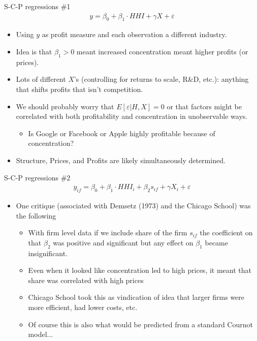\documentclass[xcolor=pdftex,dvipsnames,table,mathserif,aspectratio=169]{beamer}
\begin{document}
\begin{frame}{S-C-P regressions \#1}
\begin{eqnarray*}
y = \beta_0 + \beta_1 \cdot HHI + \gamma X +  \varepsilon
\end{eqnarray*}

\begin{itemize}
\item Using $y$ as profit measure and each observation a different industry.
\item Idea is that $\beta_1 > 0$ meant increased concentration meant higher profits (or prices).
\item Lots of different $X$'s (controlling for returns to scale, R\&D, etc.): anything that shifts profits that isn't competition.
\item We should probably worry that $E[\varepsilon | H, X ] = 0$ or that factors might be correlated with both profitability and concentration in unobservable ways.
\begin{itemize}
\item Is Google or Facebook or Apple highly profitable because of concentration?
\end{itemize}
\item Structure, Prices, and Profits are likely simultaneously determined.
\end{itemize}
\end{frame}

\begin{frame}{S-C-P regressions \#2}
\begin{eqnarray*}
y_{if} = \beta_0 + \beta_1 \cdot HHI_i + \beta_2 s_{if} +  \gamma X_{i} +  \varepsilon
\end{eqnarray*}
\begin{itemize}
\item One critique (associated with Demsetz (1973) and the Chicago School) was the following
\begin{itemize}
\item With firm level data if we include share of the firm $s_{if}$ the coefficient on that $\beta_2$ was positive and significant but any effect on $\beta_1$ became insignificant.
\item Even when it looked like concentration led to high prices, it meant that share was correlated with high prices
\item Chicago School took this as vindication of idea that larger firms were more efficient, had lower costs, etc.
\item Of course this is also what would be predicted from a standard Cournot model...
\end{itemize}
\end{itemize}
\end{frame}
\end{document}
